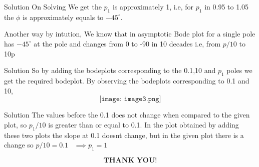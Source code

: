 \documentclass{beamer}
\begin{document}
\begin{frame}{Solution}
On Solving We get the $p_1$ is approximately 1, i.e, for $p_1$ in 0.95 to 1.05 the $\phi$ is approximately equals to $-45^{\circ}$.

Another way by intution, We know that in asymptotic Bode plot for a single pole has $-45^{\circ}$ at the pole and changes from 0 to -90 in 10 decades i.e, from $p/10$ to 10p
  
\end{frame}


\begin{frame}{Solution}
So by adding the bodeplots corresponding to the 0.1,10 and $p_1$ poles we get the required bodeplot.
By observing the bodeplots corresponding to 0.1 and 10,
\[\texttt{[image: image3.png]}\]
\end{frame}
\begin{frame}{Solution}
The values before the 0.1 does not change when compared to the given plot, so $p_1/10$ is greater than or equal to 0.1.
In the plot obtained by adding these two plots the slope at 0.1 doesnt change, but in the given plot there is a change so $p/10 = 0.1 $ 
\
$\implies p_1 = 1$
\end{frame}

\begin{frame}
\[\textbf{THANK \ YOU!}\]
\end{frame}
\end{document}
